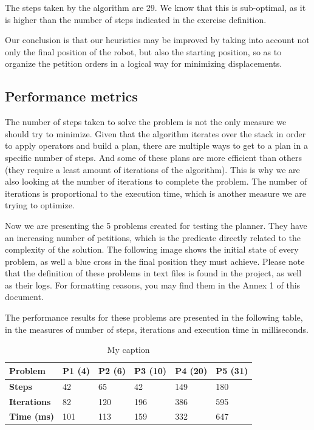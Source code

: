 \documentclass[12pt,a4paper,oneside]{article}
\numberwithin{equation}{section}
\numberwithin{equation}{section}
\theoremstyle{definition}
\begin{document}
The steps taken by the algorithm are 29. We know that this is sub-optimal, as it is higher than the number of steps indicated in the exercise definition.

Our conclusion is that our heuristics may be improved by taking into account not only the final position of the robot, but also the starting position, so as to organize the petition orders in a logical way for minimizing displacements.

\subsection{Performance metrics}
The number of steps taken to solve the problem is not the only measure we should try to minimize. Given that the algorithm iterates over the stack in order to apply operators and build a plan, there are multiple ways to get to a plan in a specific number of steps. And some of these plans are more efficient than others (they require a least amount of iterations of the algorithm). This is why we are also looking at the number of iterations to complete the problem. The number of iterations is proportional to the execution time, which is another measure we are trying to optimize. 

Now we are presenting the 5 problems created for testing the planner. They have an increasing number of petitions, which is the predicate directly related to the complexity of the solution. The following image shows the initial state of every problem, as well a blue cross in the final position they must achieve. Please note that the definition of these problems in text files is found in the project, as well as their logs. For formatting reasons, you may find them in the Annex 1 of this document.

The performance results for these problems are presented in the following table, in the measures of number of steps, iterations and execution time in milliseconds.

\begin{table}[]
	\centering
	\caption{My caption}
	\label{my-label}
	\begin{tabular}{llllll}
		\hline
		Problem             & \textbf{P1 (4)} & \textbf{P2 (6)} & \textbf{P3 (10)} & \textbf{P4 (20)} & \textbf{P5 (31)} \\ \hline
		\textbf{Steps}      & 42          & 65          & 42          & 149         & 180         \\
		\textbf{Iterations} & 82          & 120         & 196         & 386         & 595         \\
		\textbf{Time (ms)}  & 101         & 113         & 159         & 332         & 647         \\ \hline
	\end{tabular}
\end{table}
\end{document}
